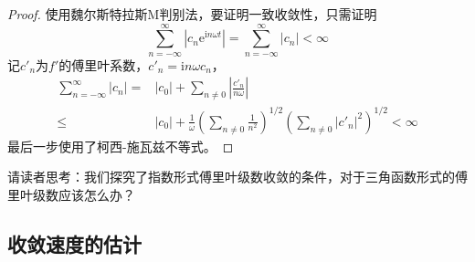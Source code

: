 \begin{proof}
    使用魏尔斯特拉斯M判别法，要证明一致收敛性，只需证明
    $$\sum_{n=-\infty}^{\infty}\left|c_n \mathrm{e}^{\mathrm{i}n\omega t}\right|=\sum_{n=-\infty}^{\infty}|c_n|<\infty$$
    记$c'_n$为$f'$的傅里叶系数，$c'_n =\mathrm{i}n\omega c_n$，
    \begin{align*}
        \sum_{n=-\infty}^{\infty}|c_n|=&|c_0|+\sum_{n\neq 0}\left| \frac{c'_n}{n\omega}\right|\\
        \leq & |c_0|+\frac{1}{\omega}\left(\sum_{n\neq 0}\frac{1}{n^2}\right)^{1/2}\left(\sum_{n\neq 0}|c'_n|^2\right)^{1/2}<\infty
\end{align*}
最后一步使用了柯西-施瓦兹不等式。
\end{proof}

请读者思考：我们探究了指数形式傅里叶级数收敛的条件，对于三角函数形式的傅里叶级数应该怎么办？

\subsection{收敛速度的估计}\label{sub:converge_speed}

